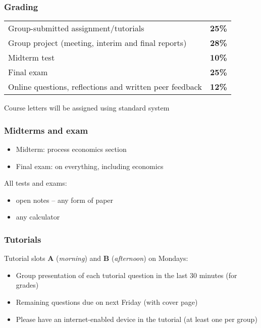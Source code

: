 \begin{frame}\frametitle{Grading}
	\begin{tabular}{lc}
		Group-submitted assignment/tutorials 					& \textbf{25\%} \\
		Group project (meeting, interim and final reports)		& \textbf{28\%} \\
		Midterm test											& \textbf{10\%} \\
		Final exam												& \textbf{25\%} \\
		Online questions, reflections and written peer feedback	& \textbf{12\%} 
	\end{tabular}
	
	\vspace{24pt}
	Course letters will be assigned using standard system
\end{frame}

\begin{frame}\frametitle{Midterms and exam}
	
	\begin{itemize}
		\item	Midterm: process economics section
		\item	Final exam: on everything, including economics
	\end{itemize}
	\vspace{24pt}
	All tests and exams:
	\begin{itemize}
		\item	open notes -- any form of paper
		\item	any calculator
	\end{itemize}	
\end{frame}

\begin{frame}\frametitle{Tutorials}
	Tutorial slots \textbf{A} (\emph{morning}) and \textbf{B} (\emph{afternoon}) on Mondays:
	
	\begin{itemize}
		\item	Group presentation of each tutorial question in the last 30 minutes {\scriptsize (for grades)}
		\item	Remaining questions due on next Friday {\scriptsize (with cover page)}
		\item	Please have an internet-enabled device in the tutorial (at least one per group)
	\end{itemize}
\end{frame}

